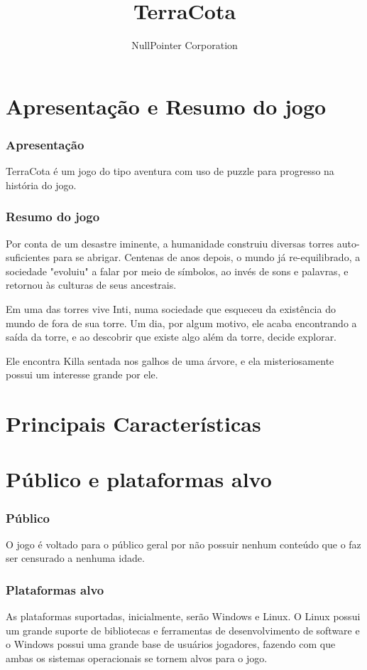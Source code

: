 \documentclass[11pt]{article}
\begin{document}
\title{TerraCota}
\author{NullPointer Corporation}
\date{}
\maketitle

\newpage

\tableofcontents
\newpage
\part{Apresentação e Resumo do jogo}
\section{Apresentação}
TerraCota é um jogo do tipo aventura com uso de puzzle para progresso na história do jogo. 

\section{Resumo do jogo}
Por conta de um desastre iminente, a humanidade construiu diversas torres auto-suficientes para se abrigar.
Centenas de anos depois, o mundo já re-equilibrado, a sociedade "evoluiu" a falar por meio de símbolos, ao invés de sons e palavras, e retornou às culturas de seus ancestrais.

Em uma das torres vive Inti, numa sociedade que esqueceu da existência do mundo de fora de sua torre.
Um dia, por algum motivo, ele acaba encontrando a saída da torre, e ao descobrir que existe algo além da torre, decide explorar.

Ele encontra Killa sentada nos galhos de uma árvore, e ela misteriosamente possui um interesse grande por ele.
\newpage
\part{Principais Características}
\newpage
\part{Público e plataformas alvo}
\section{Público}
O jogo é voltado para o público geral por não possuir nenhum conteúdo que o faz ser censurado a nenhuma idade.
\section{Plataformas alvo}
As plataformas suportadas, inicialmente, serão Windows e Linux.
O Linux possui um grande suporte de bibliotecas e ferramentas de desenvolvimento de software e o Windows possui uma grande base de usuários jogadores, fazendo com que ambas os sistemas operacionais se tornem alvos para o jogo.
\newpage
\end{document}
